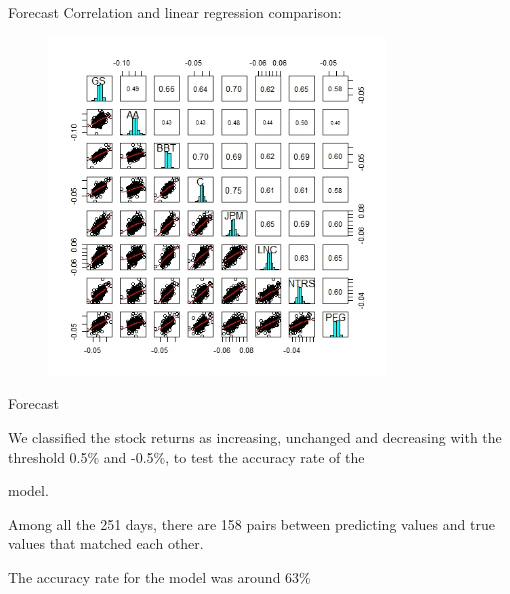 \documentclass{beamer}
\begin{document}
\begin{frame}

\begin{block}{Forecast}
Correlation and linear regression comparison:
\begin{figure}
     \includegraphics[width=0.8\textwidth, height=0.8\textheight]{gspairs.jpeg}
    \end{figure}

\end{block}


\end{frame}

\begin{frame}

\begin{block}{Forecast}

We classified the stock returns as increasing, unchanged and decreasing with the threshold 0.5\% and -0.5\%, to test the accuracy rate of the

model.

Among all the 251 days, there are 158 pairs between predicting values and true values that matched each other.

The accuracy rate for the model was around 63\% 


\end{block}

\end{frame}
\end{document}
